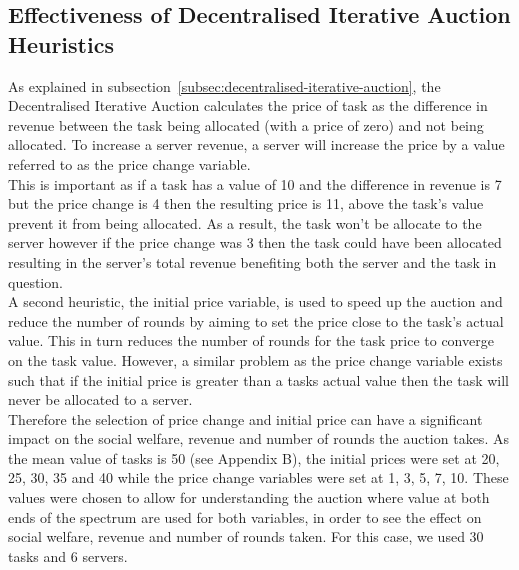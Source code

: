 
\subsection{Effectiveness of Decentralised Iterative Auction Heuristics}
\label{subsec:effectiveness-of-decentralised-iterative-auction-heuristics}
As explained in subsection~\ref{subsec:decentralised-iterative-auction}, the Decentralised Iterative Auction
calculates the price of task as the difference in revenue between the task being allocated (with a price of
zero) and not being allocated. To increase a server revenue, a server will increase the price by a value referred to as
the price change variable. \\
This is important as if a task has a value of 10 and the difference in revenue is 7 but the
price change is 4 then the resulting price is 11, above the task's value prevent it from being allocated. As a result,
the task won't be allocate to the server however if the price change was 3 then the task could have been allocated
resulting in the server's total revenue benefiting both the server and the task in question. \\
A second heuristic, the initial price variable, is used to speed up the auction and reduce the number of rounds by
aiming to set the price close to the task's actual value. This in turn reduces the number of rounds for the task price
to converge on the task value. However, a similar problem as the price change variable exists such that if the initial
price is greater than a tasks actual value then the task will never be allocated to a server. \\
Therefore the selection of price change and initial price can have a significant impact on the social welfare, revenue
and number of rounds the auction takes. As the mean value of tasks is 50 (see Appendix B),
the initial prices were set at 20, 25, 30, 35 and 40 while the price change variables were set at 1, 3, 5, 7, 10. These
values were chosen to allow for understanding the auction where value at both ends of the spectrum are used for both
variables, in order to see the effect on social welfare, revenue and number of rounds taken. For this case, we used
30 tasks and 6 servers.

